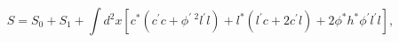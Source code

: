 \begin{equation}
S=S_{0}+S_{1}+\int d^{2}x\left[ c^{\ast }\left( c^{\prime }c+\phi ^{\prime
\,\,2}l^{\prime }l\right) +l^{\ast }\left( l^{\prime }c+2c^{\prime }l\right)
+2\phi ^{\ast }h^{\ast }\phi ^{\prime }l^{\prime }l\right] ,  \label{Acw3BV}
\end{equation}


